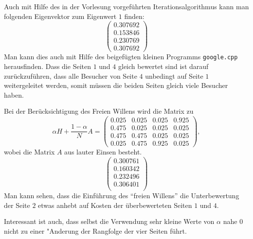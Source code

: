 \begin{loesung}
\begin{teilaufgaben}
Auch mit Hilfe des in der Vorlesung vorgeführten Iterationsalgorithmus
kann man folgenden Eigenvektor zum Eigenwert $1$ finden:
\[
\begin{pmatrix}
0.307692\\
0.153846\\
0.230769\\
0.307692
\end{pmatrix}
\]
Man kann dies auch mit Hilfe des beigefügten kleinen Programms
{\tt google.cpp} herausfinden.
Dass die Seiten $1$ und $4$ gleich bewertet sind ist darauf zurückzuführen,
dass alle Besucher von Seite $4$ unbedingt auf Seite $1$ weitergeleitet
werden, somit müssen die beiden Seiten gleich viele Besucher haben.
\item
Bei der Berücksichtigung des Freien Willens wird die Matrix zu
\[
\alpha H+\frac{1-\alpha}N A
=
\left(\begin{matrix}
0.025&0.025&0.025&0.925\\
0.475&0.025&0.025&0.025\\
0.475&0.475&0.025&0.025\\
0.025&0.475&0.925&0.025
\end{matrix}\right),
\]
wobei die Matrix $A$ aus lauter Einsen besteht.
\[
\left(\begin{matrix}
0.300761\\
0.160342\\
0.232496\\
0.306401\\
\end{matrix}\right)
\]
Man kann sehen, dass die Einführung des ``freien Willens'' die
Unterbewertung der Seite $2$ etwas anhebt auf Kosten der
überbewerteten Seiten $1$ und $4$.

Interessant ist auch, dass selbst die Verwendung sehr kleine Werte von
$\alpha$ nahe $0$ nicht zu einer "Anderung der Rangfolge der vier
Seiten führt.
\qedhere
\end{teilaufgaben}
\end{loesung}

